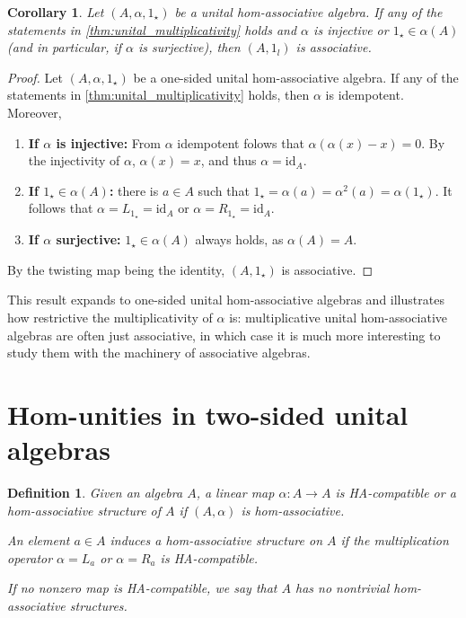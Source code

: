 \documentclass[12pt]{article}
\newtheorem{definition}[theorem]{Definition}
\newtheorem{corollary}[theorem]{Corollary}
\begin{document}
		\begin{corollary}
			Let $(A,\alpha,1_\star)$ be a unital hom-associative algebra. If any of the statements in \cref{thm:unital_multiplicativity} holds and $\alpha$ is injective or $1_\star\in \alpha(A)$ (and in particular, if $\alpha$ is surjective), then $(A,1_l)$ is associative.
		\end{corollary}
		\begin{proof}
			Let $(A,\alpha,1_\star)$ be a one-sided unital hom-associative algebra. If any of the statements in  \cref{thm:unital_multiplicativity} holds, then $\alpha$ is idempotent. Moreover,
			
			\begin{enumerate}
				\item \textbf{If $\alpha$ is injective:} From  $\alpha$ idempotent folows that $\alpha(\alpha(x)-x)=0$. By the injectivity of $\alpha$,  $\alpha(x)=x$, and thus $\alpha=\mathrm{id}_ A $.
				\item \textbf{If $1_\star\in\alpha(A)$:} there is $a\in A$ such that $1_\star=\alpha(a)=\alpha^2(a)=\alpha(1_\star)$. It follows that $\alpha=L_{1_\star}=\mathrm{id}_A$ or $\alpha=R_{1_\star}=\mathrm{id}_A$.
				\item \textbf{If $\alpha$ surjective:} $1_\star\in\alpha(A)$ always holds, as $\alpha(A)=A$.
			\end{enumerate}
			By the twisting map being the identity, $(A,1_\star)$ is associative.
		\end{proof}
		This result expands \cite[Corollary 1.3]{FreGohr:UnitCond} to one-sided unital hom-associative algebras and illustrates how restrictive the multiplicativity of $\alpha$ is: multiplicative unital hom-associative algebras are often just associative, in which case it is much more interesting to study them with the machinery of associative algebras.
		
		
		\section{Hom-unities in two-sided unital algebras}\label{sec:hom-unities-2SU}
		
		\begin{definition}
			Given an algebra $A$, a linear map $\alpha\colon A\to A$ is \emph{HA-compatible} or a \emph{hom-associative structure of $A$} if $(A,\alpha)$ is hom-associative.
			
			An element $a\in A$ \emph{induces a hom-associative structure} on $A$ if the multiplication operator $\alpha=L_a$ or $\alpha=R_a$ is HA-compatible.
			
			If no nonzero map is HA-compatible, we say that $A$ has no nontrivial hom-associative structures.
		\end{definition}
		
\end{document}
